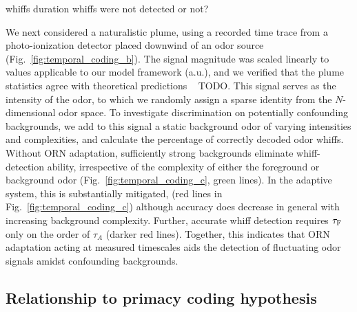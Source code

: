{\color {blue} whiffs duration whiffs were not detected or not?}

We next considered a naturalistic plume, using a recorded time trace from a photo-ionization detector placed downwind of an odor source (Fig.~\ref{fig:temporal_coding_b}). The signal magnitude was scaled linearly to values applicable to our model framework (a.u.), and we verified that the plume statistics agree with theoretical predictions {~\color{blue} TODO}. %
This signal serves as the intensity of the odor, to which we randomly assign a sparse identity from the $N$-dimensional odor space. To investigate discrimination on potentially confounding backgrounds, we add to this signal a static background odor of varying intensities and complexities, and calculate the percentage of correctly decoded odor whiffs. Without ORN adaptation, sufficiently strong backgrounds eliminate whiff-detection ability, irrespective of the complexity of either the foreground or background odor (Fig.~\ref{fig:temporal_coding_c}, green lines). In the adaptive system, this is substantially mitigated, (red lines in Fig.~\ref{fig:temporal_coding_c}) although accuracy does decrease in general with increasing background complexity. Further, accurate whiff detection requires $\tau_{\textup {F}}$ only on the order of $\tau_A$ (darker red lines). Together, this indicates that ORN adaptation acting at measured timescales  aids the detection of fluctuating odor signals amidst confounding backgrounds.

\subsection{Relationship to primacy coding hypothesis}



